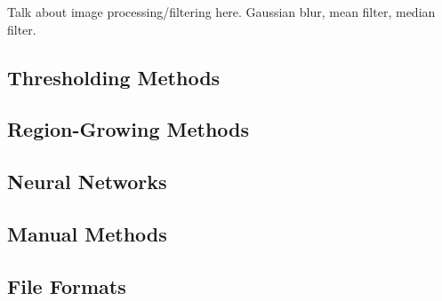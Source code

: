 Talk about image processing/filtering here. Gaussian blur, mean filter, median filter.

\subsection{Thresholding Methods}
\label{Thresholding Methods}

\subsection{Region-Growing Methods}
\label{Region-Growing Methods}

\subsection{Neural Networks}
\label{Neural Networks}

\subsection{Manual Methods}
\label{Manual Methods}

\subsection{File Formats}
\label{Data Format-SEG}

